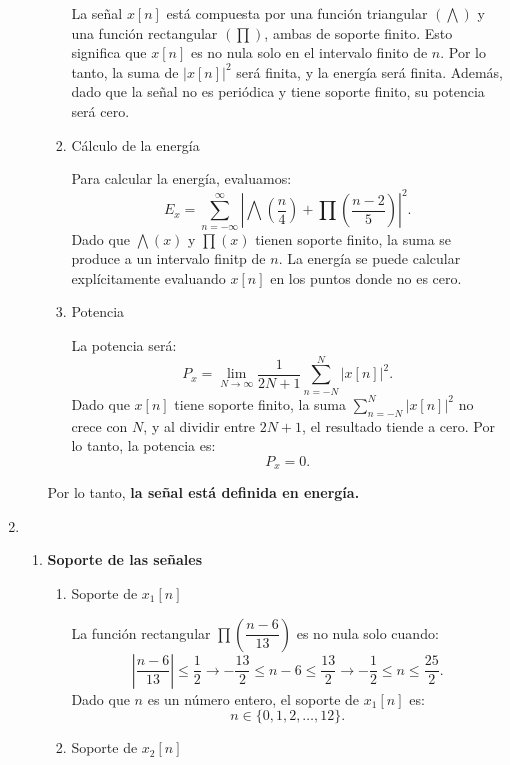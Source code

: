 \begin{enumerate}[label=\color{red}\textbf{\arabic*)}]
\begin{enumerate}[label=\textbf{\arabic*)}]
\begin{enumerate}[label=\alph*)]
                    La señal  $x[n]$ está compuesta por una función triangular $\left( \bigwedge \right) $ y una función rectangular $\left( \prod \right) $, ambas de soporte finito. Esto significa que $x[n]$ es no nula solo en el intervalo finito de  $n$. Por lo tanto, la suma de  $|x[n]|^2$ será finita, y la energía será finita. Además, dado que la señal no es periódica y tiene soporte finito, su potencia será cero.
                \item Cálculo de la energía

                    Para calcular la energía, evaluamos: \[
                    E_x=\sum_{n=-\infty}^{\infty} \left| \bigwedge\left( \dfrac{n}{4} \right) +\prod\left( \dfrac{n-2}{5} \right)  \right| ^2.
                    \] 
                    Dado que $\bigwedge(x)$ y  $\prod(x)$ tienen soporte finito, la suma se produce a un intervalo finitp de  $n$. La energía se puede calcular explícitamente evaluando  $x[n]$ en los puntos donde no es cero.
                \item Potencia

                    La potencia será:  \[
                        P_x=\lim_{N \to \infty} \dfrac{1}{2N+1}\sum_{n=-N}^{N} |x[n]|^2.
                    \] 
                    Dado que $x[n]$ tiene soporte finito, la suma $\sum_{n=-N}^{N} |x[n]|^2$ no crece con $N$, y al dividir entre $2N+1$, el resultado tiende a cero. Por lo tanto, la potencia es:  \[
                    P_x=0.
                    \] 
            \end{enumerate}
            Por lo tanto, \textbf{la señal está definida en energía.} 
    \end{enumerate}

\item {}

\begin{enumerate}[label=\textbf{\arabic*)}]
    \item \textbf{Soporte de las señales}
        \begin{enumerate}[label=\alph*)]
            \item Soporte de $x_1[n]$

                La función rectangular $\prod\left( \dfrac{n-6}{13} \right) $ es no nula solo cuando: \[
                \left| \dfrac{n-6}{13} \right| \le \dfrac{1}{2}\longrightarrow -\dfrac{13}{2}\le n-6\le \dfrac{13}{2}\longrightarrow -\dfrac{1}{2}\le n\le \dfrac{25}{2}.
                \] 
                Dado que $n$ es un número entero, el soporte de $x_1[n]$ es: \[
                    n\in \{0,1,2,\dots,12\} .
                \] 
            \item Soporte de $x_2[n]$


\end{enumerate}
\end{enumerate}
\end{enumerate}

